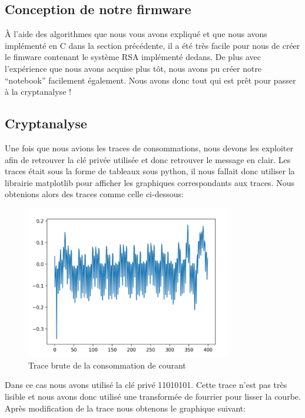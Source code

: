 \subsection{Conception de notre firmware}
À l'aide des algorithmes que nous vous avons expliqué et que nous avons implémenté en C dans la section précédente, il a été très facile pour nous de créer le fimware contenant le système RSA implémenté dedans. De plus avec l'expérience que nous avons acquise plus tôt, nous avons pu créer notre ``notebook'' facilement également. Nous avons donc tout qui est prêt pour passer à la cryptanalyse !

\subsection{Cryptanalyse}
Une fois que nous avions les traces de consommations, nous devons les exploiter afin de retrouver la clé privée utilisée et donc retrouver le message en clair. 
Les traces était sous la forme de tableaux sous python, il nous fallait donc utiliser la librairie matplotlib pour afficher les graphiques correspondants aux traces. 
Nous obtenions alors des traces comme celle ci-dessous:
\begin{figure}[H]
    \centering
    \includegraphics[width=0.8\textwidth]{fig/trace_brute.png}
    \caption{Trace brute de la consommation de courant}
    \label{fig:trace_brute}
\end{figure}
Dans ce cas nous avons utilisé la clé privé 11010101.
Cette trace n'est pas très lisible et nous avons donc utilisé une transformée de fourrier pour lisser la courbe. Après modification de la trace nous obtenons le graphique suivant:

